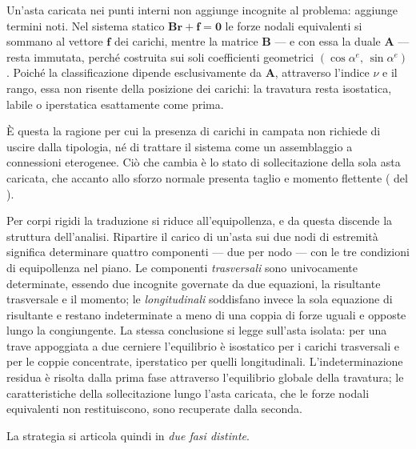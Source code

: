 \begin{oss}\label{oss:carichi_campata_classificazione}
		Un'asta caricata nei punti interni non aggiunge incognite
		al problema: aggiunge termini noti. Nel sistema statico
		$\bm{B}\bm{r} + \bm{f} = \bm{0}$ le forze nodali
		equivalenti si sommano al vettore $\bm{f}$ dei carichi,
		mentre la matrice $\bm{B}$ --- e con essa la duale
		$\bm{A}$ --- resta immutata, perché costruita sui soli
		coefficienti geometrici $(\cos\alpha^e,\,\sin\alpha^e)$.
		Poiché la classificazione dipende esclusivamente da
		$\bm{A}$, attraverso l'indice $\nu$ e il rango, essa non
		risente della posizione dei carichi: la travatura resta
		isostatica, labile o iperstatica esattamente come prima.
		
		È questa la ragione per cui la presenza di carichi in
		campata non richiede di uscire dalla tipologia, né di
		trattare il sistema come un assemblaggio a connessioni
		eterogenee. Ciò che cambia è lo stato di sollecitazione
		della sola asta caricata, che accanto allo sforzo normale
		presenta taglio e momento flettente
		( del
		).
\end{oss}

Per corpi rigidi la traduzione si riduce
all'equipollenza, e da questa discende la struttura
dell'analisi. Ripartire il carico di un'asta sui due nodi
di estremità significa determinare quattro componenti ---
due per nodo --- con le tre condizioni di equipollenza
nel piano. Le componenti \emph{trasversali} sono
univocamente determinate, essendo due incognite governate
da due equazioni, la risultante trasversale e il momento;
le \emph{longitudinali} soddisfano invece la sola
equazione di risultante e restano indeterminate a meno di
una coppia di forze uguali e opposte lungo la
congiungente. La stessa conclusione si legge sull'asta
isolata: per una trave appoggiata a due cerniere
l'equilibrio è isostatico per i carichi trasversali e per
le coppie concentrate, iperstatico per quelli
longitudinali. L'indeterminazione residua è risolta dalla
prima fase attraverso l'equilibrio globale della
travatura; le caratteristiche della sollecitazione lungo
l'asta caricata, che le forze nodali equivalenti non
restituiscono, sono recuperate dalla seconda.

La strategia si articola quindi in \emph{due fasi
	distinte}.




